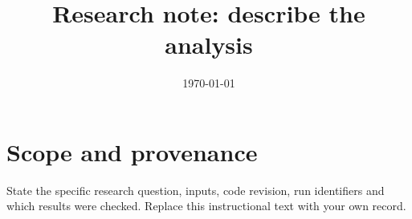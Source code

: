 \documentclass[11pt,a4paper]{scrartcl}
\title{Research note: describe the analysis}
\author{}
\date{\today}
\begin{document}
\maketitle

\section*{Scope and provenance}
State the specific research question, inputs, code revision, run identifiers and
which results were checked. Replace this instructional text with your own record.





% 
% 
\end{document}
